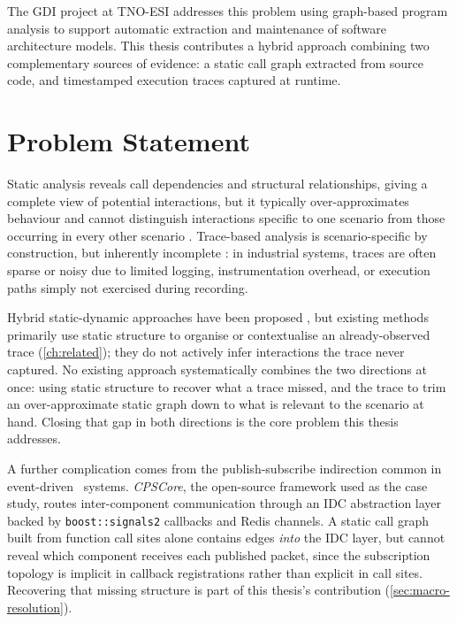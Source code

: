 The \ac{GDI} project at \ac{TNO}-\ac{ESI} addresses this problem using
graph-based program analysis to support automatic extraction and
maintenance of software architecture models. This thesis contributes a
hybrid approach combining two complementary sources of evidence: a
static call graph extracted from source code, and timestamped execution
traces captured at runtime.

\section{Problem Statement}

Static analysis reveals call dependencies and structural relationships,
giving a complete view of potential interactions, but it typically
over-approximates behaviour and cannot distinguish interactions specific
to one scenario from those occurring in every other scenario
\cite{systa:reverse}. Trace-based analysis is scenario-specific by
construction, but inherently incomplete \cite{cornelissen:systematic}:
in industrial systems, traces are often sparse or noisy due to limited
logging, instrumentation overhead, or execution paths simply not
exercised during recording.

Hybrid static-dynamic approaches have been proposed
\cite{labiche:hybrid, cornelissen:systematic}, but existing methods
primarily use static structure to organise or contextualise an
already-observed trace (\cref{ch:related}); they do not actively infer
interactions the trace never captured. No existing approach
systematically combines the two directions at once: using static
structure to recover what a trace missed, and the trace to trim an
over-approximate static graph down to what is relevant to the scenario
at hand. Closing that gap in both directions is the core problem this
thesis addresses.

A further complication comes from the publish-subscribe indirection
common in event-driven \Cpp\ systems. \emph{CPSCore}, the open-source
framework used as the case study, routes inter-component communication
through an \ac{IDC} abstraction layer backed by \texttt{boost::signals2}
callbacks and Redis channels. A static call graph built from function
call sites alone contains edges \emph{into} the IDC layer, but cannot
reveal which component receives each published packet, since the
subscription topology is implicit in callback registrations rather than
explicit in call sites. Recovering that missing structure is part of
this thesis's contribution (\cref{sec:macro-resolution}).

